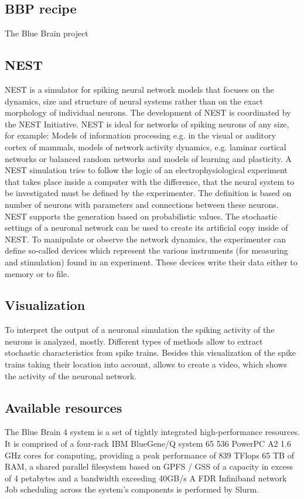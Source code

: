 \documentclass[a4paper]{article}
\begin{document}
\subsection{BBP recipe}
	The Blue Brain project   

\subsection{NEST}
NEST is a simulator for spiking neural network models that focuses on the dynamics, size and structure of neural systems rather than on the exact morphology of individual neurons. The development of NEST is coordinated by the NEST Initiative. NEST is ideal for networks of spiking neurons of any size, for example:
Models of information processing e.g. in the visual or auditory cortex of mammals, models of network activity dynamics, e.g. laminar cortical networks or balanced random networks and models of learning and plasticity. A NEST simulation tries to follow the logic of an electrophysiological experiment that takes place inside a computer with the difference, that the neural system to be investigated must be defined by the experimenter. The definition is based on number of neurons with parameters and connections between these neurons. NEST supports the generation based on probabilistic values. The stochastic settings of a neuronal network can be used to create its artificial copy inside of NEST. To manipulate or observe the network dynamics, the experimenter can define so-called devices which represent the various instruments (for measuring and stimulation) found in an experiment. These devices write their data either to memory or to file. 

\subsection{Visualization}
To interpret the output of a neuronal simulation the spiking activity of the neurons is analyzed, mostly. Different types of methods allow to extract stochastic characteristics from spike trains. Besides this visualization of the spike trains taking their location into account, allows to create a video, which shows the activity of the neuronal network.


\subsection{Available resources}   
The Blue Brain 4 system is a set of tightly integrated high-performance resources. It is comprised of a four-rack IBM BlueGene/Q system 65 536 PowerPC A2 1.6 GHz cores for computing, providing a peak performance of 839 TFlops 65 TB of RAM, a shared parallel filesystem based on GPFS / GSS of a capacity in excess of 4 petabytes and a bandwidth exceeding 40GB/s A FDR Infiniband network Job scheduling across the system's components is performed by Slurm. 
\end{document}

